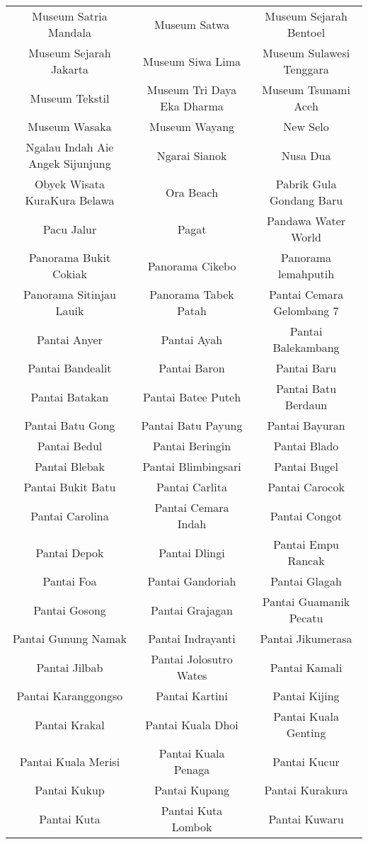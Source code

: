 \begin{table}[H]
\begin{tabular}{ c | c | c}
Museum Satria Mandala & Museum Satwa & Museum Sejarah Bentoel\\
Museum Sejarah Jakarta & Museum Siwa Lima & Museum Sulawesi Tenggara\\
Museum Tekstil & Museum Tri Daya Eka Dharma & Museum Tsunami Aceh\\
Museum Wasaka & Museum Wayang & New Selo\\
Ngalau Indah Aie Angek Sijunjung & Ngarai Sianok & Nusa Dua\\
Obyek Wisata KuraKura Belawa & Ora Beach & Pabrik Gula Gondang Baru\\
Pacu Jalur & Pagat & Pandawa Water World\\
Panorama Bukit Cokiak & Panorama Cikebo & Panorama lemahputih\\
Panorama Sitinjau Lauik & Panorama Tabek Patah & Pantai  Cemara Gelombang 7\\
Pantai Anyer & Pantai Ayah & Pantai Balekambang\\
Pantai Bandealit & Pantai Baron & Pantai Baru\\
Pantai Batakan & Pantai Batee Puteh & Pantai Batu Berdaun\\
Pantai Batu Gong & Pantai Batu Payung & Pantai Bayuran\\
Pantai Bedul & Pantai Beringin & Pantai Blado\\
Pantai Blebak & Pantai Blimbingsari & Pantai Bugel\\
Pantai Bukit Batu & Pantai Carlita & Pantai Carocok\\
Pantai Carolina & Pantai Cemara Indah & Pantai Congot\\
Pantai Depok & Pantai Dlingi & Pantai Empu Rancak\\
Pantai Foa & Pantai Gandoriah & Pantai Glagah\\
Pantai Gosong & Pantai Grajagan & Pantai Guamanik Pecatu\\
Pantai Gunung Namak & Pantai Indrayanti & Pantai Jikumerasa\\
Pantai Jilbab & Pantai Jolosutro Wates & Pantai Kamali\\
Pantai Karanggongso & Pantai Kartini & Pantai Kijing\\
Pantai Krakal & Pantai Kuala Dhoi & Pantai Kuala Genting\\
Pantai Kuala Merisi & Pantai Kuala Penaga & Pantai Kucur\\
Pantai Kukup & Pantai Kupang & Pantai Kurakura\\
Pantai Kuta & Pantai Kuta Lombok & Pantai Kuwaru\\

\end{tabular}
\end{table}
